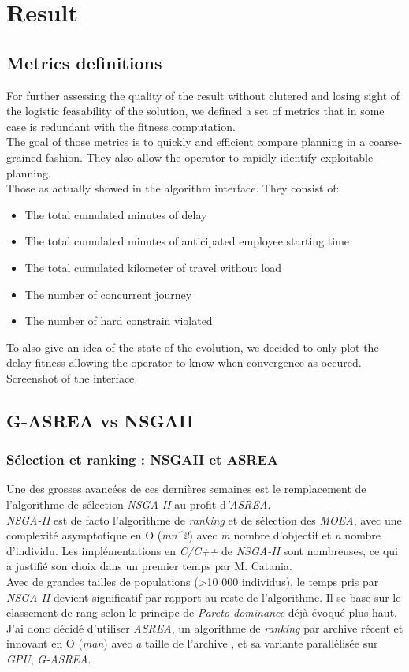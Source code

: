 \documentclass[12pt]{memoir}
\begin{document}
\section{Result}
\subsection{Metrics definitions}
For further assessing the quality of the result without clutered and losing sight of the logistic feasability of the solution, we defined a set of metrics that in some case is redundant with the fitness computation. \\
The goal of those metrics is to quickly and efficient compare planning in a coarse-grained fashion. They also allow the operator to rapidly identify exploitable planning.\\
Those as actually showed in the algorithm interface. They consist of: 
\begin{itemize}
  \item The total cumulated minutes of delay
  \item The total cumulated minutes of anticipated employee starting time
  \item The total cumulated kilometer of travel without load
  \item The number of concurrent journey
  \item The number of hard constrain violated
\end{itemize}
To also give an idea of the state of the evolution, we decided to only plot the delay 
fitness allowing the operator to know when convergence as occured.
Screenshot of the interface 
\subsection{G-ASREA vs NSGAII}
\subsubsection{Sélection et ranking : NSGAII et
	ASREA}\label{suxe9lection-et-ranking-nsgaii-et-asrea}

Une des grosses avancées de ces dernières semaines est le remplacement
de l'algorithme de sélection \emph{NSGA-II\cite{deb2002fast}} au profit d\emph{'ASREA\cite{sharma2010archived,tsutsui2013massively}}.\\
\emph{NSGA-II} est de facto l'algorithme de \emph{ranking} et de
sélection des \emph{MOEA}, avec une complexité asymptotique en O
(\emph{mn\^{}2}) avec \emph{m} nombre d'objectif et \emph{n} nombre
d'individu. Les implémentations en \emph{C/C++} de \emph{NSGA-II} sont
nombreuses, ce qui a justifié son choix dans un premier temps par M.
Catania.\\
Avec de grandes tailles de populations (\textgreater{}10 000
individus), le temps pris par \textit{NSGA-II} devient significatif par
rapport au reste de l'algorithme. Il se base sur le classement de rang
selon le principe de \textit{Pareto dominance} déjà évoqué plus haut. J'ai donc
décidé d'utiliser \textit{ASREA}, un algorithme de \textit{ranking} par archive
récent et innovant en O (\emph{man}) avec \emph{a} taille de l'archive ,
et sa variante parallélisée sur \emph{GPU}, \emph{G-ASREA\cite{sharma2010gpgpu}}.
\end{document}
